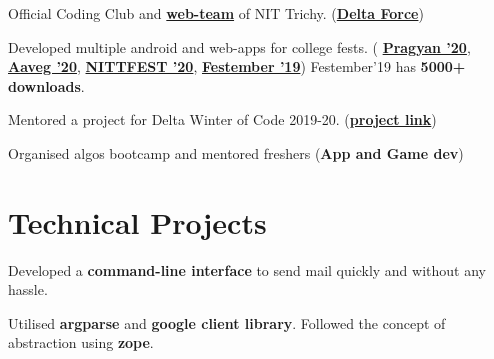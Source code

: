\documentclass[]{deedy-resume-openfont}
\begin{document}
\begin{minipage}[t]{0.67\textwidth}
\begin{tightemize}\item Official Coding Club and \textbf{\href{https://www.nitt.edu/home/webteam/}{web-team}} of NIT Trichy. (\textbf{\href{https://delta.nitt.edu/}{Delta Force}})
\item Developed multiple android and web-apps for college fests. ( \textbf{\href{https://play.google.com/store/apps/details?id=com.pragyan20.app&hl=en}{Pragyan '20}}, \textbf{\href{https://play.google.com/store/apps/details?id=in.aaveg.aaveg2020&hl=en}{Aaveg '20}},
\textbf{\href{https://play.google.com/store/apps/details?id=com.nittfest20.app}{NITTFEST '20}}, \textbf{\href{https://play.google.com/store/apps/details?id=com.festember19.app&hl=en}{Festember '19}})  Festember'19 has \textbf{5000+ downloads}.
\item Mentored a project for Delta Winter of Code 2019-20. (\textbf{\href{https://github.com/avikumar15/photographer}{project link}})
\item Organised algos bootcamp and mentored freshers (\textbf{App and Game dev})
\end{tightemize}
\sectionsep


\section{Technical Projects}


\begin{tightemize}
\item Developed a \textbf{command-line interface} to send mail quickly and without any hassle.
\item Utilised \textbf{argparse} and \textbf{google client library}. Followed the concept of abstraction using \textbf{zope}.
\end{tightemize}
\sectionsep



\end{minipage}
\end{document}
